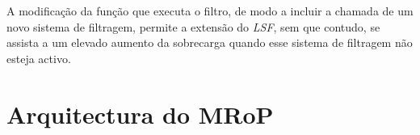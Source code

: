 A modificação da função que executa o filtro, de modo a incluir a chamada de um novo sistema de filtragem, permite a extensão do \textit{LSF}, sem que contudo, se assista a um elevado aumento da sobrecarga quando esse sistema de filtragem não esteja activo.






\section{Arquitectura do MRoP}
\label{sec:mrop_architecture}

